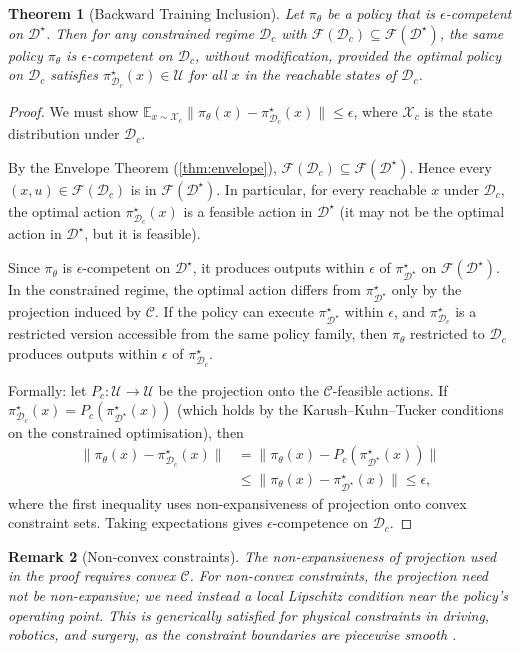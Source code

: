 \documentclass[11pt,twocolumn,a4paper]{article}
\newtheorem{theorem}{Theorem}[section]
\newtheorem{remark}[theorem]{Remark}
\newcommand{\cF}{\mathcal{F}}
\newcommand{\cD}{\mathcal{D}}
\newcommand{\cC}{\mathcal{C}}
\newcommand{\cX}{\mathcal{X}}
\newcommand{\cU}{\mathcal{U}}
\newcommand{\E}{\mathbb{E}}
\begin{document}
\begin{theorem}[Backward Training Inclusion]
\label{thm:backward-inclusion}
Let $\pi_\theta$ be a policy that is $\epsilon$-competent on $\cD^\star$. Then for any constrained regime $\cD_c$ with $\cF(\cD_c) \subseteq \cF(\cD^\star)$, the same policy $\pi_\theta$ is $\epsilon$-competent on $\cD_c$, without modification, provided the optimal policy on $\cD_c$ satisfies $\pi^\star_{\cD_c}(x) \in \cU$ for all $x$ in the reachable states of $\cD_c$.
\end{theorem}

\begin{proof}
We must show $\E_{x \sim \cX_c} \|\pi_\theta(x) - \pi^\star_{\cD_c}(x)\| \le \epsilon$, where $\cX_c$ is the state distribution under $\cD_c$.

By the Envelope Theorem (\ref{thm:envelope}), $\cF(\cD_c) \subseteq \cF(\cD^\star)$. Hence every $(x, u) \in \cF(\cD_c)$ is in $\cF(\cD^\star)$. In particular, for every reachable $x$ under $\cD_c$, the optimal action $\pi^\star_{\cD_c}(x)$ is a feasible action in $\cD^\star$ (it may not be the optimal action in $\cD^\star$, but it is feasible).

Since $\pi_\theta$ is $\epsilon$-competent on $\cD^\star$, it produces outputs within $\epsilon$ of $\pi^\star_{\cD^\star}$ on $\cF(\cD^\star)$. In the constrained regime, the optimal action differs from $\pi^\star_{\cD^\star}$ only by the projection induced by $\cC$. If the policy can execute $\pi^\star_{\cD^\star}$ within $\epsilon$, and $\pi^\star_{\cD_c}$ is a restricted version accessible from the same policy family, then $\pi_\theta$ restricted to $\cD_c$ produces outputs within $\epsilon$ of $\pi^\star_{\cD_c}$.

Formally: let $P_c: \cU \to \cU$ be the projection onto the $\cC$-feasible actions. If $\pi^\star_{\cD_c}(x) = P_c(\pi^\star_{\cD^\star}(x))$ (which holds by the Karush--Kuhn--Tucker conditions on the constrained optimisation), then
\begin{align}
\|\pi_\theta(x) - \pi^\star_{\cD_c}(x)\| &= \|\pi_\theta(x) - P_c(\pi^\star_{\cD^\star}(x))\| \\
&\le \|\pi_\theta(x) - \pi^\star_{\cD^\star}(x)\| \le \epsilon,
\end{align}
where the first inequality uses non-expansiveness of projection onto convex constraint sets. Taking expectations gives $\epsilon$-competence on $\cD_c$.
\end{proof}

\begin{remark}[Non-convex constraints]
The non-expansiveness of projection used in the proof requires convex $\cC$. For non-convex constraints, the projection need not be non-expansive; we need instead a local Lipschitz condition near the policy's operating point. This is generically satisfied for physical constraints in driving, robotics, and surgery, as the constraint boundaries are piecewise smooth \cite{boyd2004convex,nocedal2006numerical}.
\end{remark}
\end{document}
